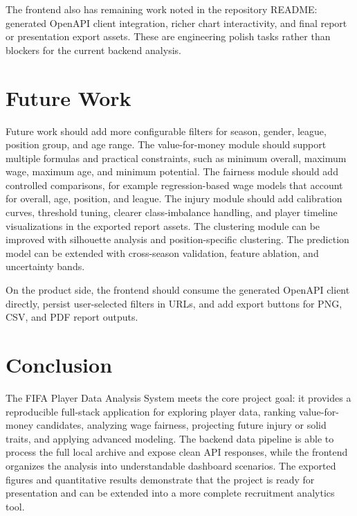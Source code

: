 \documentclass[11pt,a4paper]{article}
\begin{document}
The frontend also has remaining work noted in the repository README: generated OpenAPI client integration, richer chart interactivity, and final report or presentation export assets. These are engineering polish tasks rather than blockers for the current backend analysis.

\section{Future Work}

Future work should add more configurable filters for season, gender, league, position group, and age range. The value-for-money module should support multiple formulas and practical constraints, such as minimum overall, maximum wage, maximum age, and minimum potential. The fairness module should add controlled comparisons, for example regression-based wage models that account for overall, age, position, and league. The injury module should add calibration curves, threshold tuning, clearer class-imbalance handling, and player timeline visualizations in the exported report assets. The clustering module can be improved with silhouette analysis and position-specific clustering. The prediction model can be extended with cross-season validation, feature ablation, and uncertainty bands.

On the product side, the frontend should consume the generated OpenAPI client directly, persist user-selected filters in URLs, and add export buttons for PNG, CSV, and PDF report outputs.

\section{Conclusion}

The FIFA Player Data Analysis System meets the core project goal: it provides a reproducible full-stack application for exploring player data, ranking value-for-money candidates, analyzing wage fairness, projecting future injury or solid traits, and applying advanced modeling. The backend data pipeline is able to process the full local archive and expose clean API responses, while the frontend organizes the analysis into understandable dashboard scenarios. The exported figures and quantitative results demonstrate that the project is ready for presentation and can be extended into a more complete recruitment analytics tool.
\end{document}
